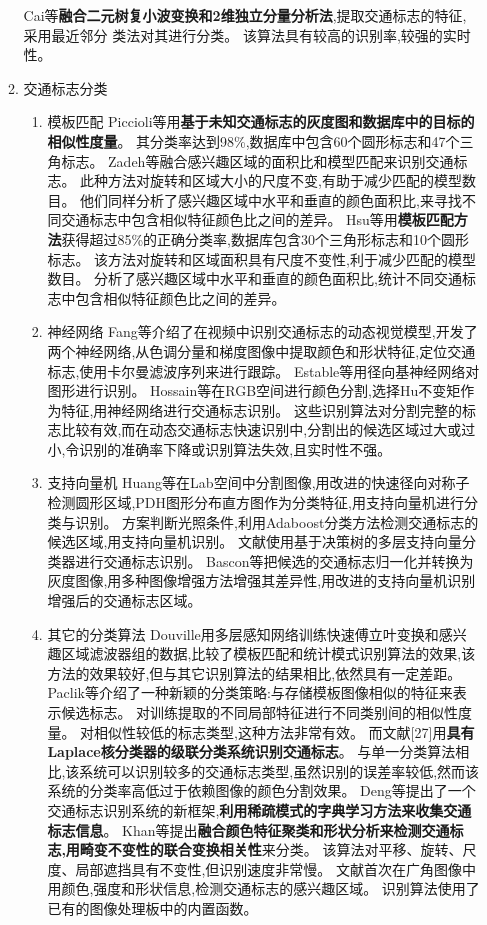 \documentclass{amsart}
\begin{document}
\begin{enumerate}
\begin{enumerate}
    Cai等\textbf{融合二元树复小波变换和2维独立分量分析法},提取交通标志的特征,采用最近邻分
    类法对其进行分类。
    该算法具有较高的识别率,较强的实时性。
  \item 交通标志分类
    \begin{enumerate}
    \item 模板匹配
      Piccioli等用\textbf{基于未知交通标志的灰度图和数据库中的目标的相似性度量}。
      其分类率达到98\%,数据库中包含60个圆形标志和47个三角标志。
      Zadeh等融合感兴趣区域的面积比和模型匹配来识别交通标志。
      此种方法对旋转和区域大小的尺度不变,有助于减少匹配的模型数目。
      他们同样分析了感兴趣区域中水平和垂直的颜色面积比,来寻找不同交通标志中包含相似特征颜色比之间的差异。
      Hsu等用\textbf{模板匹配方法}获得超过85\%的正确分类率,数据库包含30个三角形标志和10个圆形标志。
      该方法对旋转和区域面积具有尺度不变性,利于减少匹配的模型数目。
      分析了感兴趣区域中水平和垂直的颜色面积比,统计不同交通标志中包含相似特征颜色比之间的差异。
    \item 神经网络
      Fang等介绍了在视频中识别交通标志的动态视觉模型,开发了两个神经网络,从色调分量和梯度图像中提取颜色和形状特征,定位交通标志,使用卡尔曼滤波序列来进行跟踪。
      Estable等用径向基神经网络对图形进行识别。
      Hossain等在RGB空间进行颜色分割,选择Hu不变矩作为特征,用神经网络进行交通标志识别。
      这些识别算法对分割完整的标志比较有效,而在动态交通标志快速识别中,分割出的候选区域过大或过小,令识别的准确率下降或识别算法失效,且实时性不强。
    \item 支持向量机
      Huang等在Lab空间中分割图像,用改进的快速径向对称子检测圆形区域,PDH图形分布直方图作为分类特征,用支持向量机进行分类与识别。
      方案判断光照条件,利用Adaboost分类方法检测交通标志的候选区域,用支持向量机识别。
      文献使用基于决策树的多层支持向量分类器进行交通标志识别。
      Bascon等把候选的交通标志归一化并转换为灰度图像,用多种图像增强方法增强其差异性,用改进的支持向量机识别增强后的交通标志区域。
    \item 其它的分类算法
      Douville用多层感知网络训练快速傅立叶变换和感兴趣区域滤波器组的数据,比较了模板匹配和统计模式识别算法的效果,该方法的效果较好,但与其它识别算法的结果相比,依然具有一定差距。
      Paclik等介绍了一种新颖的分类策略:与存储模板图像相似的特征来表示候选标志。
      对训练提取的不同局部特征进行不同类别间的相似性度量。
      对相似性较低的标志类型,这种方法非常有效。
      而文献[27]用\textbf{具有Laplace核分类器的级联分类系统识别交通标志}。
      与单一分类算法相比,该系统可以识别较多的交通标志类型,虽然识别的误差率较低,然而该系统的分类率高低过于依赖图像的颜色分割效果。
      Deng等提出了一个交通标志识别系统的新框架,\textbf{利用稀疏模式的字典学习方法来收集交通标志信息}。
      Khan等提出\textbf{融合颜色特征聚类和形状分析来检测交通标志,用畸变不变性的联合变换相关性}来分类。
      该算法对平移、旋转、尺度、局部遮挡具有不变性,但识别速度非常慢。
      文献首次在广角图像中用颜色,强度和形状信息,检测交通标志的感兴趣区域。
      识别算法使用了已有的图像处理板中的内置函数。
    \end{enumerate}
  \end{enumerate}
  \end{enumerate}
\end{document}
